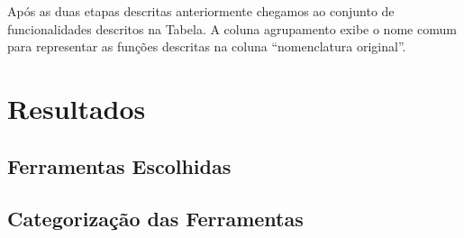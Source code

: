Após as duas etapas descritas anteriormente chegamos ao conjunto de
funcionalidades descritos na Tabela. A coluna agrupamento exibe o nome comum
para representar as funções descritas na coluna ``nomenclatura original''.

\section{Resultados}
\label{sec:resultados}

\subsection{Ferramentas Escolhidas}
\label{subsec:resultados_ferramentas_escolhidas}


\begin{table}[htb]
\centering
\caption{Ferramentas utilizados no estudo}
\label{tab:ferramenta_utilizadas_estudo}
\end{table}


\subsection{Categorização das Ferramentas}
\label{subsec:categorizacao_ferramentas}

